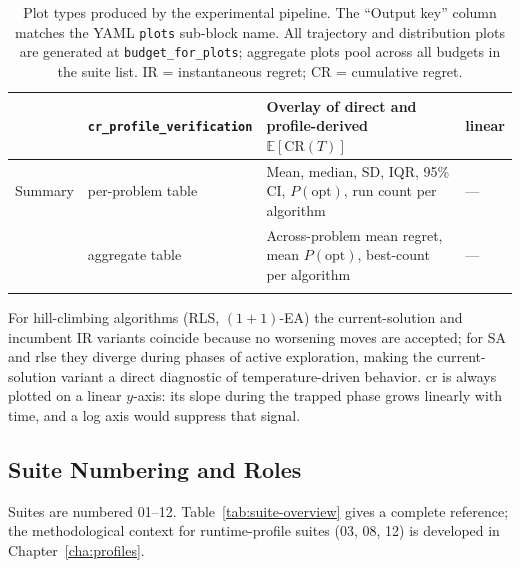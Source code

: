 \begin{longtable}{@{}llp{4.6cm}l@{}}
  & \texttt{cr\_profile\_verification}          & Overlay of direct
  and profile-derived $\mathbb{E}[\mathrm{CR}(T)]$ & linear \\
  \midrule
  Summary & per-problem table            & Mean, median, SD, IQR,
  95\% CI, $P(\text{opt})$, run count per algorithm & --- \\
  & aggregate table              & Across-problem mean regret, mean
  $P(\text{opt})$, best-count per algorithm & --- \\
  \bottomrule
  \caption[Experimental pipeline plot types]{Plot types produced by
    the experimental pipeline. The ``Output key''
    column matches the YAML \texttt{plots} sub-block name.
    All trajectory and distribution plots are generated at
    \texttt{budget\_for\_plots}; aggregate plots pool across all budgets in the
  suite list. IR = instantaneous regret; CR = cumulative regret.}
  \label{tab:plot-types-cat}
\end{longtable}

For hill-climbing algorithms (RLS, $(1+1)$-EA) the current-solution and
incumbent IR variants coincide because no worsening moves are accepted; for SA
and \acrshort{rlse} they diverge during phases of active exploration,
making the current-solution variant a direct diagnostic of temperature-driven
behavior. \acrshort{cr} is always plotted on a linear $y$-axis: its slope
during the trapped phase grows linearly with time, and a log axis would suppress
that signal.

\subsection{Suite Numbering and Roles}

Suites are numbered 01--12. Table~\ref{tab:suite-overview} gives a complete
reference; the methodological context for runtime-profile suites (03, 08, 12)
is developed in Chapter~\ref{cha:profiles}.

